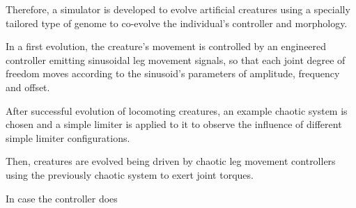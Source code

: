 \documentclass[main]{subfiles}
\begin{document}
Therefore, a simulator is developed to evolve artificial creatures using a specially tailored type of genome to co-evolve the individual's controller and morphology. %

In a first evolution, the creature's movement is controlled by an engineered controller emitting sinusoidal leg movement signals, so that each joint degree of freedom moves according to the sinusoid's parameters of amplitude, frequency and offset. %

After successful evolution of locomoting creatures, an example chaotic system is chosen and a simple limiter is applied to it to observe the influence of different simple limiter configurations. %

Then, creatures are evolved being driven by chaotic leg movement controllers using the previously chaotic system to exert joint torques. %

In case the controller does
\end{document}
